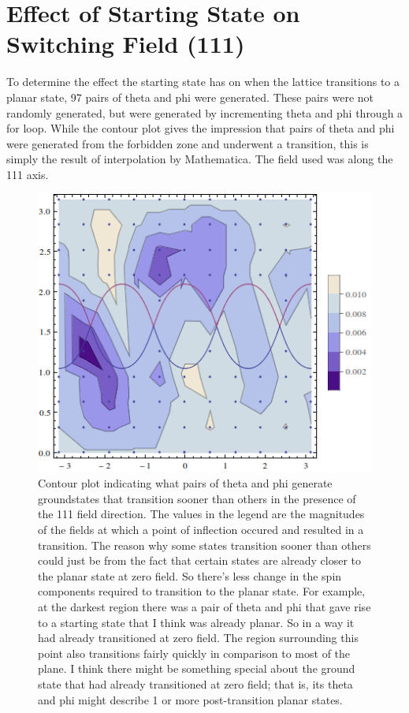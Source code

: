 \documentclass{article}
\begin{document}
\section{Effect of Starting State on Switching Field (111)}
To determine the effect the starting state has on when the lattice transitions to a planar state, 97 pairs of
theta and phi were generated. These pairs were not randomly generated, but were generated by incrementing theta and phi
through a for loop. While the contour plot gives the impression that pairs of theta and phi were generated from the 
forbidden zone and underwent a transition, this is simply the result of interpolation by Mathematica. The field used
was along the 111 axis.
\begin{figure}[ht]
 \centering
 \includegraphics[scale=0.76]{97pheta/3DswitchingfieldContour.png}
 \caption{Contour plot indicating what pairs of theta and phi generate groundstates that transition sooner than others
 in the presence of the 111 field direction. The values in the legend are the magnitudes of the fields at which a
 point of inflection occured and resulted in a transition. The reason why some states transition sooner than others
 could just be from the fact that certain states are already closer to the planar state at zero field. So there's less
 change in the spin components required to transition to the planar state. For example,
 at the darkest region there was a pair of theta and phi that gave rise to a starting state that I think was already planar. So in
 a way it had already transitioned at zero field. The region surrounding this point also transitions fairly quickly
 in comparison to most of the plane. I think there might be something special about the ground state that had already
 transitioned at zero field; that is, its theta and phi might describe 1 or more post-transition planar states.}
\end{figure}
\clearpage
\end{document}
